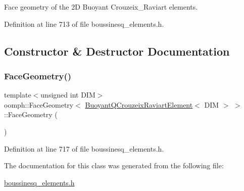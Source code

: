 Face geometry of the 2D Buoyant Crouzeix\+\_\+\+Raviart elements. 

Definition at line 713 of file boussinesq\+\_\+elements.\+h.



\subsection{Constructor \& Destructor Documentation}
\mbox{\label{classoomph_1_1FaceGeometry_3_01BuoyantQCrouzeixRaviartElement_3_01DIM_01_4_01_4_a3cda0efe7f320d2eee2d7af336fa51fa}} 
\subsubsection{\texorpdfstring{Face\+Geometry()}{FaceGeometry()}}
{\footnotesize\ttfamily template$<$unsigned int D\+IM$>$ \\
oomph\+::\+Face\+Geometry$<$ \hyperlink{classoomph_1_1BuoyantQCrouzeixRaviartElement}{Buoyant\+Q\+Crouzeix\+Raviart\+Element}$<$ D\+IM $>$ $>$\+::Face\+Geometry (\begin{DoxyParamCaption}{ }\end{DoxyParamCaption})\hspace{0.3cm}{\ttfamily [inline]}}



Definition at line 717 of file boussinesq\+\_\+elements.\+h.



The documentation for this class was generated from the following file\+:\begin{DoxyCompactItemize}
\item 
\hyperlink{boussinesq__elements_8h}{boussinesq\+\_\+elements.\+h}\end{DoxyCompactItemize}
